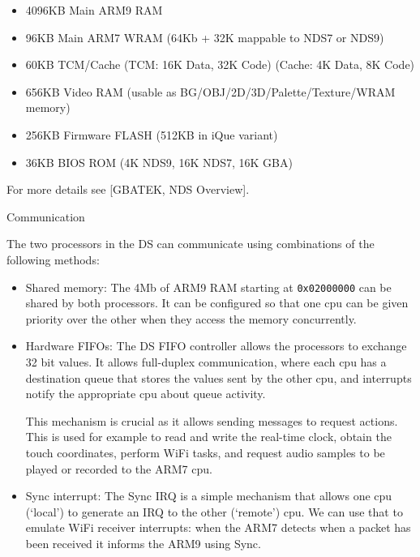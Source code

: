 \documentclass[11pt]{p9article}
\makeatletter
\renewcommand\subsection{\@startsection {subsection}{1}{\z@} {3pt}
{1pt} {\normalfont\normalsize\bfseries}}
\makeatother
\begin{document}
\begin{itemize}
	\item 4096KB	Main ARM9 RAM
	\item 96KB	Main ARM7 WRAM (64Kb + 32K mappable to NDS7 or NDS9)
	\item 60KB	TCM/Cache (TCM: 16K Data, 32K Code) (Cache: 4K Data, 8K Code)
	\item 656KB	Video RAM (usable as BG/OBJ/2D/3D/Palette/Texture/WRAM memory)
	\item 256KB	Firmware FLASH (512KB in iQue variant)
	\item 36KB	BIOS ROM (4K NDS9, 16K NDS7, 16K GBA)
\end{itemize}

For more details see \cite{gbatek}[GBATEK, NDS Overview].

\subsection{Communication}

The two processors in the DS can communicate using combinations of the following methods:
\begin{itemize}
	\item Shared memory:
	The 4Mb of ARM9 RAM starting at \texttt{0x02000000} can be shared by both processors.
	It can be configured so that one cpu can be given priority over the other when they access
	the memory concurrently.
	
	\item Hardware FIFOs:
	The DS FIFO controller allows the processors to exchange 32 bit values.
	It allows full-duplex communication, where each cpu has a destination queue
	that stores the values sent by the other cpu, and interrupts notify the appropriate cpu about queue activity.

	This mechanism is crucial as it allows sending messages to request actions.
	This is used for example to read and write the real-time clock, obtain the touch coordinates,
	perform WiFi tasks, and request audio samples to be played or recorded to the ARM7 cpu.
	
	\item Sync interrupt:
	The Sync IRQ is a simple mechanism that allows one cpu (`local') to generate an IRQ
	to the other (`remote') cpu. We can use that to emulate WiFi receiver interrupts:
	when the ARM7 detects when a packet has been received it informs the ARM9 using Sync.
	
\end{itemize}
\end{document}
